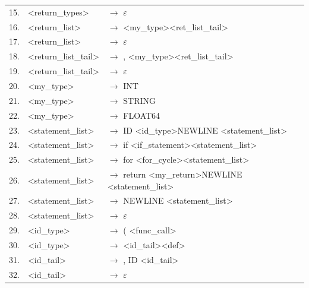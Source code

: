 \documentclass[a4paper,11pt]{article}
\begin{document}
\begin{table}[h!]
\begin{center}
\begin{scriptsize}
\begin{tabular}{lll}
    					15. &\textless return\_types\textgreater 	   & $\rightarrow$ $\varepsilon$\\
    					16. &\textless return\_list\textgreater 	   & $\rightarrow$ \textless my\_type\textgreater  \textless ret\_list\_tail\textgreater \\
    					17. &\textless return\_list\textgreater  	   & $\rightarrow$ $\varepsilon$\\
    					18. &\textless return\_list\_tail\textgreater & $\rightarrow$ , \textless my\_type\textgreater  \textless ret\_list\_tail\textgreater \\
    					19. &\textless return\_list\_tail\textgreater & $\rightarrow$ $\varepsilon$\\
    					20. &\textless my\_type\textgreater  	   & $\rightarrow$ INT\\
    					21. &\textless my\_type\textgreater  	   & $\rightarrow$ STRING\\
    					22. &\textless my\_type\textgreater  	   & $\rightarrow$ FLOAT64\\
    					23. &\textless statement\_list\textgreater  & $\rightarrow$ ID \textless id\_type\textgreater  NEWLINE \textless statement\_list\textgreater \\
    					24. &\textless statement\_list\textgreater  & $\rightarrow$ if \textless if\_statement\textgreater  \textless statement\_list\textgreater \\
    					25. &\textless statement\_list\textgreater  & $\rightarrow$ for \textless for\_cycle\textgreater  \textless statement\_list\textgreater \\
    					26. &\textless statement\_list\textgreater  & $\rightarrow$ return \textless my\_return\textgreater  NEWLINE \textless statement\_list\textgreater \\
    					27. &\textless statement\_list\textgreater  & $\rightarrow$ NEWLINE \textless statement\_list\textgreater \\
    					28. &\textless statement\_list\textgreater  & $\rightarrow$ $\varepsilon$\\
    					29. &\textless id\_type\textgreater  	   & $\rightarrow$ ( \textless func\_call\textgreater \\
    					30. &\textless id\_type\textgreater  	   & $\rightarrow$ \textless id\_tail\textgreater  \textless def\textgreater \\
    					31. &\textless id\_tail\textgreater  	   & $\rightarrow$ , ID \textless id\_tail\textgreater \\
    					32. &\textless id\_tail\textgreater  	   & $\rightarrow$ $\varepsilon$\\

\end{tabular}
\end{scriptsize}
\end{center}
\end{table}
\end{document}
